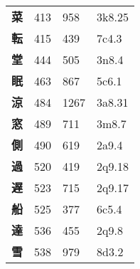 \begin{longtable}[c]{llll}
    \bfseries 菜 & 413 & 958 & 3k8.25\\
    \bfseries 転 & 415 & 439 & 7c4.3\\
    \bfseries 堂 & 444 & 505 & 3n8.4\\
    \bfseries 眠 & 463 & 867 & 5c6.1\\
    \bfseries 涼 & 484 & 1267 & 3a8.31\\
    \bfseries 窓 & 489 & 711 & 3m8.7\\
    \bfseries 側 & 490 & 619 & 2a9.4\\
    \bfseries 過 & 520 & 419 & 2q9.18\\
    \bfseries 遅 & 523 & 715 & 2q9.17\\
    \bfseries 船 & 525 & 377 & 6c5.4\\
    \bfseries 達 & 536 & 455 & 2q9.8\\
    \bfseries 雪 & 538 & 979 & 8d3.2\\
  \end{longtable}
